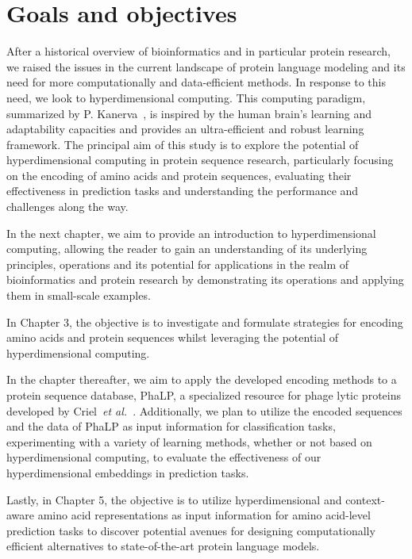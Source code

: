 \section{Goals and objectives}
After a historical overview of bioinformatics and in particular protein research, we raised the issues in the current landscape of protein language modeling and its need for more computationally and data-efficient methods. In response to this need, we look to hyperdimensional computing. This computing paradigm, summarized by P. Kanerva~\cite{Kanerva2009}, is inspired by the human brain's learning and adaptability capacities and provides an ultra-efficient and robust learning framework. The principal aim of this study is to explore the potential of hyperdimensional computing in protein sequence research, particularly focusing on the encoding of amino acids and protein sequences, evaluating their effectiveness in prediction tasks and understanding the performance and challenges along the way.

In the next chapter, we aim to provide an introduction to hyperdimensional computing, allowing the reader to gain an understanding of its underlying principles, operations and its potential for applications in the realm of bioinformatics and protein research by demonstrating its operations and applying them in small-scale examples.

In Chapter 3, the objective is to investigate and formulate strategies for encoding amino acids and protein sequences whilst leveraging the potential of hyperdimensional computing.

In the chapter thereafter, we aim to apply the developed encoding methods to a protein sequence database, PhaLP, a specialized resource for phage lytic proteins developed by Criel~\textit{et al.}~\cite{phalp}. Additionally, we plan to utilize the encoded sequences and the data of PhaLP as input information for classification tasks, experimenting with a variety of learning methods, whether or not based on hyperdimensional computing, to evaluate the effectiveness of our hyperdimensional embeddings in prediction tasks.

Lastly, in Chapter 5, the objective is to utilize hyperdimensional and context-aware amino acid representations as input information for amino acid-level prediction tasks to discover potential avenues for designing computationally efficient alternatives to state-of-the-art protein language models.